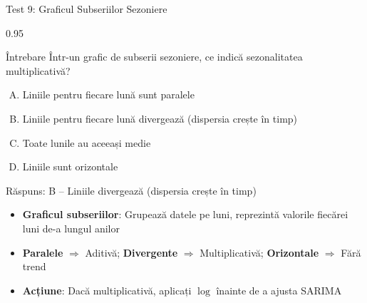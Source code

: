 \documentclass[9pt, aspectratio=169, t]{beamer}
\begin{document}
\begin{frame}{Test 9: Graficul Subseriilor Sezoniere}
    \begin{cminipage}{0.95\textwidth}
    \begin{alertblock}{Întrebare}
        Într-un grafic de subserii sezoniere, ce indică sezonalitatea multiplicativă?
    \end{alertblock}

    \vspace{0.3cm}

    \begin{enumerate}[A)]\setlength{\itemsep}{0pt}
        \item Liniile pentru fiecare lună sunt paralele
        \item Liniile pentru fiecare lună divergează (dispersia crește în timp)
        \item Toate lunile au aceeași medie
        \item Liniile sunt orizontale
    \end{enumerate}

    \vspace{0.5cm}
    \pause
    \begin{exampleblock}{Răspuns: B -- Liniile divergează (dispersia crește în timp)}
        {\small
        \begin{itemize}\setlength{\itemsep}{0pt}
        \item \textbf{Graficul subseriilor}: Grupează datele pe luni, reprezintă valorile fiecărei luni de-a lungul anilor
        \item \textbf{Paralele} $\Rightarrow$ Aditivă; \textbf{Divergente} $\Rightarrow$ Multiplicativă; \textbf{Orizontale} $\Rightarrow$ Fără trend
        \item \textbf{Acțiune}: Dacă multiplicativă, aplicați $\log$ înainte de a ajusta SARIMA
        \end{itemize}
        }
    \end{exampleblock}
    \end{cminipage}
\end{frame}
\end{document}
